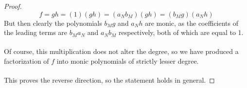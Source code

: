 \documentclass[12pt]{article}
\newenvironment{ex}[2][Exercise]{\begin{trivlist}
\item[\hskip \labelsep {\bfseries #1}\hskip \labelsep {\bfseries #2.}]}{\end{trivlist}}
\begin{document}
\begin{ex}{1}
\begin{proof}
        \begin{equation}
            f = gh = (1)(gh) = (a_Nb_M)(gh) = (b_Mg)(a_Nh)
        \end{equation}
        But then clearly the polynomials $b_Mg$ and $a_Nh$ are monic, as the coefficients of the leading terms are $b_Ma_N$ and $a_Nb_M$ respectively, both of which are equal to 1. \\ \\
        Of course, this multiplication does not alter the degree, so we have produced a factorization of $f$ into monic polynomials of strictly lesser degree. \\ \\
        This proves the reverse direction, so the statement holds in general.
    \end{proof}
\end{ex}
\end{document}
